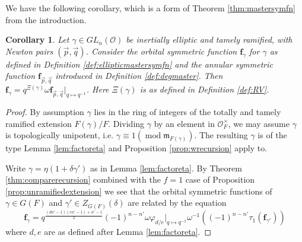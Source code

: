 \documentclass{amsart}
\numberwithin{equation}{section}
\newtheorem{corollary}[lemma]{Corollary}%
\theoremstyle{definition}
\newcommand{\frs}{\mathbf{f}_{\vec{p},\vec{q}}}
\newcommand{\fpq}{\frs}
\newcommand{\fgamma}{\mathbf{f}_{\gamma}}
\newcommand{\cO}{\mathcal{O}}
\begin{document}
We have the following corollary, which is a form of Theorem \ref{thm:mastersymfn} from the introduction. 
\begin{corollary}
\label{cor:inertiallyelliptic}
Let $\gamma\in GL_n(\cO)$ be inertially elliptic and tamely ramified, with Newton pairs $(\vec{p},\vec{q})$. 
Consider the orbital symmetric function $\fgamma$ for $\gamma$ as defined in Definition \ref{def:ellipticmastersymfn} and the annular symmetric function $\fpq$ introduced in Definition \ref{def:degmaster}. Then $\fgamma=q^{\Xi(\gamma)} \omega \fpq|_{q\mapsto q^{-1}}$. Here $\Xi(\gamma)$ is as defined in Definition \ref{def:RV}.
\end{corollary}
\begin{proof}
    By assumption $\gamma$ lies in the ring of integers of the totally and tamely ramified extension $F(\gamma)/F$. Dividing $\gamma$ by an element in $\cO_F^{\times}$, we may assume $\gamma$ is topologically unipotent, i.e. $\gamma\equiv1(\operatorname{mod} \mathfrak{m}_{F(\gamma)})$. The resulting $\gamma$ is of the type Lemma \ref{lem:factoreta} and Proposition \ref{prop:wrecursion} apply to.
    
    Write $\gamma=\eta(1+\delta\gamma')$ as in Lemma \ref{lem:factoreta}.  By Theorem \ref{thm:comparerecursion} combined with the $f=1$ case of Proposition \ref{prop:unramifiedextension} we see that the orbital symmetric functions of $\gamma\in G(F)$ and $\gamma'\in Z_{G(F)}(\delta)$ are related by the equation $$\fgamma=q^{\frac{(dn'-1)(en'-1)+n'-1}{2}}(-1)^{n-n'}\omega\varphi_{d/e}|_{q\mapsto q^{-1}}\omega^{-1}((-1)^{n-n'}\tau_1(\mathbf{f}_{\gamma'}))$$
    where $d, e$ are as defined after Lemma \ref{lem:factoreta}. 
    


\end{proof}
\end{document}
